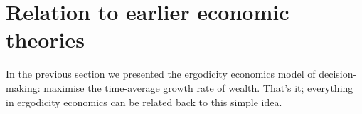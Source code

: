 %
%
%

\section{Relation to earlier economic theories }
In the previous section we presented the ergodicity economics model of decision-making: maximise the time-average growth rate of wealth.
That's it; everything in ergodicity economics can be related back to this simple idea. 

